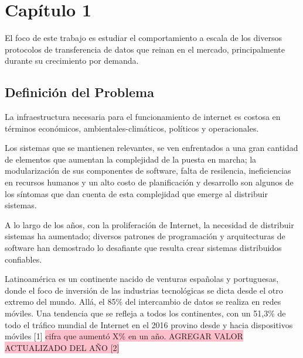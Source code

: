 \chapter{Capítulo 1}

El foco de este trabajo es estudiar el comportamiento a escala de los diversos protocolos de transferencia de datos que reinan en el mercado, principalmente durante su crecimiento por demanda.


\section{Definición del Problema}

La infraestructura necesaria para el funcionamiento de internet es costosa en términos económicos, ambientales-climáticos, políticos y operacionales.

Los sistemas que se mantienen relevantes, se ven enfrentados a una gran cantidad de elementos que aumentan la complejidad de la puesta en marcha; la modularización de sus componentes de software, falta de resilencia, ineficiencias en recursos humanos y un alto costo de planificación y desarrollo son algunos de los síntomas que dan cuenta de esta complejidad que emerge al distribuir sistemas.

A lo largo de los años, con la proliferación de Internet, la necesidad de distribuir sistemas ha aumentado; diversos patrones de programación y arquitecturas de software han demostrado lo desafiante que resulta crear sistemas distribuidos confiables.


Latinoamérica es un continente nacido de venturas españolas y portuguesas, donde el foco de inversión de las industrias tecnológicas se dicta desde el otro extremo del mundo. Allá, el 85\% del intercambio de datos se realiza en redes móviles. Una tendencia que se refleja a todos los continentes, con un 51,3\% de todo el tráfico mundial de Internet en el 2016 provino desde y hacia dispositivos móviles [1] \colorbox{pink}{cifra que aumentó X\% en un año. AGREGAR VALOR ACTUALIZADO DEL AÑO [2]}

